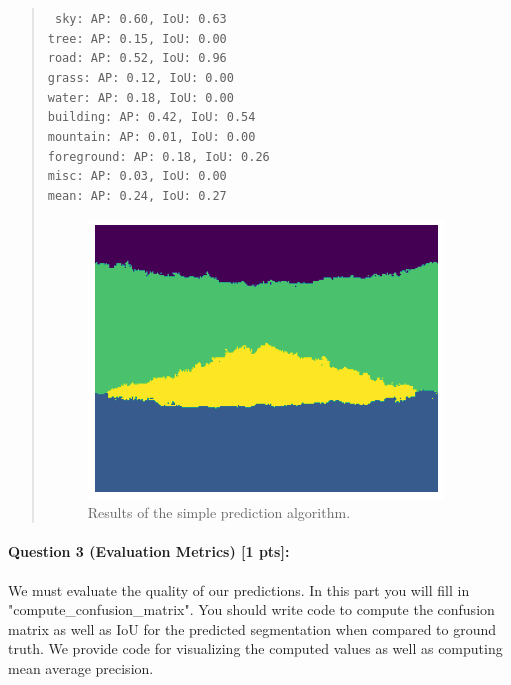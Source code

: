 \documentclass[11pt]{article}
\begin{document}
\begin{quote}
{\centering \tt \small
sky: AP: 0.60, IoU: 0.63 \\
tree: AP: 0.15, IoU: 0.00 \\
road: AP: 0.52, IoU: 0.96 \\
grass: AP: 0.12, IoU: 0.00 \\
water: AP: 0.18, IoU: 0.00 \\
building: AP: 0.42, IoU: 0.54 \\
mountain: AP: 0.01, IoU: 0.00 \\
foreground: AP: 0.18, IoU: 0.26 \\
misc: AP: 0.03, IoU: 0.00 \\
mean: AP: 0.24, IoU: 0.27 \\
}

\begin{figure}[h]
    \centering
    \includegraphics[width=0.5\linewidth]{simple_predict.png}
    \caption{Results of the simple prediction algorithm.}
    \label{fig:simple-predict}
\end{figure}

\end{quote}

\paragraph{Question 3 (Evaluation Metrics) [1 pts]:}  
We must evaluate the quality of our predictions. In this part you will fill in "compute\_confusion\_matrix". You should write code to compute the confusion matrix as well as IoU for the predicted segmentation when compared to ground truth. We provide code for visualizing the computed values as well as computing mean average precision.
\end{document}
